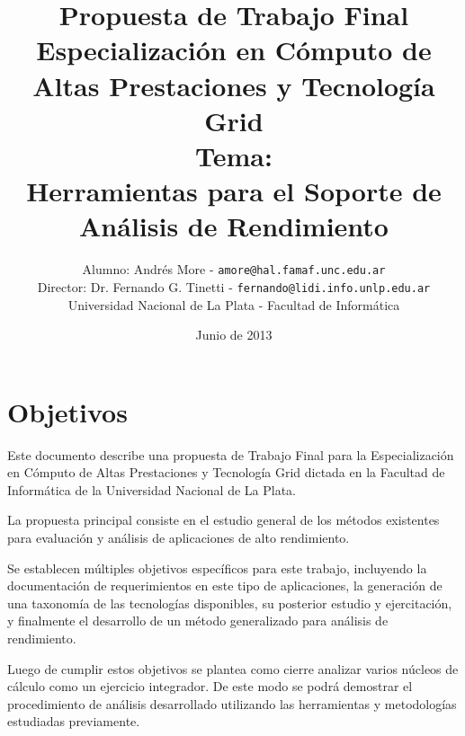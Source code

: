\documentclass[a4paper]{article}
\begin{document}
\title{Propuesta de Trabajo Final\\
\bigskip
Especializaci\'on en C\'omputo de Altas Prestaciones y Tecnolog\'ia Grid\\
\bigskip
Tema:\\
Herramientas para el Soporte de An\'alisis de Rendimiento}

\author{Alumno: Andr\'es More - {\tt amore@hal.famaf.unc.edu.ar}
\\Director: Dr. Fernando G. Tinetti - {\tt fernando@lidi.info.unlp.edu.ar}
\bigskip
\\Universidad Nacional de La Plata - Facultad de Inform\'atica}

\date{Junio de 2013}

\maketitle

\newpage

\section{Objetivos}

  Este documento describe una propuesta de Trabajo Final para la
  Especializaci\'on en C\'omputo de Altas Prestaciones y Tecnolog\'ia Grid
  dictada en la Facultad de Inform\'atica de la Universidad Nacional de La
  Plata.

  \smallskip

  La propuesta principal consiste en el estudio general de los m\'etodos
  existentes para evaluaci\'on y an\'alisis de aplicaciones de alto
  rendimiento.

  \smallskip

  Se establecen m\'ultiples objetivos espec\'ificos para
  este trabajo, incluyendo la documentaci\'on de requerimientos en este
  tipo de aplicaciones, la generaci\'on de una taxonom\'ia de las
  tecnolog\'ias disponibles, su posterior estudio y ejercitaci\'on, y
  finalmente el desarrollo de un m\'etodo generalizado para an\'alisis de
  rendimiento.

  \smallskip

  Luego de cumplir estos objetivos se plantea como cierre analizar
  varios n\'ucleos de c\'alculo como un ejercicio integrador. De este modo
  se podr\'a demostrar el procedimiento de an\'alisis desarrollado
  utilizando las herramientas y metodolog\'ias estudiadas previamente.

  \smallskip
\end{document}
